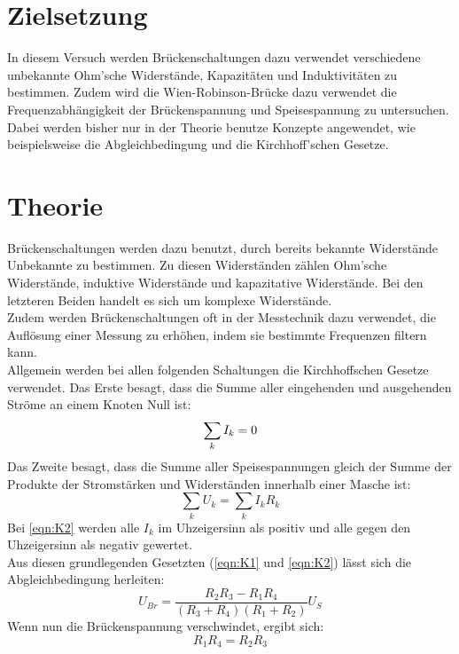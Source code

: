 \section{Zielsetzung}
\label{sec:Zielsetzung}
In diesem Versuch werden Brückenschaltungen dazu verwendet verschiedene unbekannte Ohm'sche Widerstände, Kapazitäten und Induktivitäten
zu bestimmen. Zudem wird die Wien-Robinson-Brücke dazu verwendet die Frequenzabhängigkeit der Brückenspannung und Speisespannung zu untersuchen. \\
Dabei werden bisher nur in der Theorie benutze Konzepte angewendet, wie beispielsweise die Abgleichbedingung und die Kirchhoff'schen Gesetze.

\section{Theorie}
\label{sec:Theorie}

Brückenschaltungen werden dazu benutzt, durch bereits bekannte Widerstände Unbekannte zu bestimmen. Zu diesen Widerständen zählen
Ohm'sche Widerstände, induktive Widerstände und kapazitative Widerstände. Bei den letzteren Beiden handelt es sich um komplexe
Widerstände. \\
Zudem werden Brückenschaltungen oft in der Messtechnik dazu verwendet, die Auflösung einer Messung zu erhöhen, indem sie bestimmte Frequenzen
filtern kann. \\
Allgemein werden bei allen folgenden Schaltungen die Kirchhoffschen Gesetze verwendet. Das Erste besagt, dass die Summe aller eingehenden
und ausgehenden Ströme an einem Knoten Null ist:
\begin{equation}
    \sum_k I_k = 0 \\ \label{eqn:K1}
\end{equation}
Das Zweite besagt, dass die Summe aller Speisespannungen gleich der Summe der Produkte der Stromstärken und Widerständen innerhalb einer Masche ist:
\begin{equation}
    \sum_k U_k = \sum_k I_k R_k \label{eqn:K2}
\end{equation}
Bei \autoref{eqn:K2} werden alle $I_k$ im Uhzeigersinn als positiv und alle gegen den Uhzeigersinn als negativ gewertet. \\
Aus diesen grundlegenden Gesetzten (\autoref{eqn:K1} und \autoref{eqn:K2}) lässt sich die Abgleichbedingung herleiten:
\begin{equation*}
    U_{Br} = \frac{R_2 R_3 - R_1 R_4}{(R_3 + R_4)(R_1 + R_2)} U_S
\end{equation*}
Wenn nun die Brückenspannung verschwindet, ergibt sich:
\begin{equation}
    R_1 R_4 = R_2 R_3 \label{eqn:Abgl}
\end{equation}
\\

